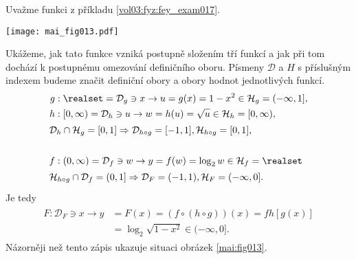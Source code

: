 \begin{mdframed}[style=mdexam]
  \begin{example}\label{MAI:exam025}
    Uvažme funkci z příkladu \ref{vol03:fyz:fey_exam017}. 
    
    {\centering
    \captionsetup{type=figure}
    \texttt{[image: mai\_fig013.pdf]}
    \par}
    
    Ukážeme, jak tato funkce vzniká postupně složením tří funkcí a jak při tom dochází k postupnému 
    omezování definičního oboru. Písmeny \(\mathcal{D}\) a \(H\) s příslušným indexem budeme značit 
    definiční obory a obory hodnot jednotlivých funkcí.
    \begin{gather*}
      \begin{align*}
        g&:  \realset =\mathcal{D}_g\ni x\rightarrow u=g(x) = 1- x^2  \in\mathcal{H}_g=(-\infty,1], \\
        h&: [0,\infty)=\mathcal{D}_h\ni u\rightarrow w=h(u) = \sqrt{u}\in\mathcal{H}_h=[0,\infty),  \\
       \shortintertext{\(\mathcal{D}_h\cap\mathcal{H}_g = [0,1]\Rightarrow\mathcal{D}_{h\circ g}=[-1,1], 
                       \mathcal{H}_{h\circ g} = [0,1],\)}                                    \\
       f&:(0,\infty)=\mathcal{D}_f\ni w \rightarrow y=f(w)=\log_2w\in\mathcal{H}_f=\realset  \\
       \shortintertext{\(\mathcal{H}_{h\circ g}\cap\mathcal{D}_f = (0,1] 
                       \Rightarrow\mathcal{D}_F=(-1,1),\mathcal{H}_F=(-\infty,0].\)} 
      \end{align*}
    \end{gather*}
    Je tedy
    \begin{gather*}
      \begin{align*}
        F:\mathcal{D}_F\ni x\rightarrow 
        y&=F(x)=(f\circ(h\circ g))(x) = f{h[g(x)]}          \\
        &= \log_2\sqrt{1-x^2}\in(-\infty,0].
      \end{align*}
    \end{gather*}
    Názorněji než tento zápis ukazuje situaci obrázek \ref{mai:fig013}.
  \end{example}
\end{mdframed}
